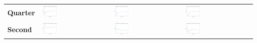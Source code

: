 \begin{tabular}{>{\centering\arraybackslash}m{}>{\centering\arraybackslash}m{}>{\centering\arraybackslash}m{}>{\centering\arraybackslash}m{}}
    \textbf{Quarter} & \includegraphics[width=0.25\textwidth]{images/win_rate_dqn_experiment_quarter_no_vs_random.png} &
    \includegraphics[width=0.25\textwidth]{images/win_rate_dqn_experiment_quarter_no_vs_ql.png} &
    \includegraphics[width=0.25\textwidth]{images/win_rate_dqn_experiment_quarter_no_vs_dqn.png} \\
    \textbf{Second} & \includegraphics[width=0.25\textwidth]{images/win_rate_dqn_experiment_second_no_vs_random.png} &
    \includegraphics[width=0.25\textwidth]{images/win_rate_dqn_experiment_second_no_vs_ql.png} &
    \includegraphics[width=0.25\textwidth]{images/win_rate_dqn_experiment_second_no_vs_dqn.png} \\
  \end{tabular}

